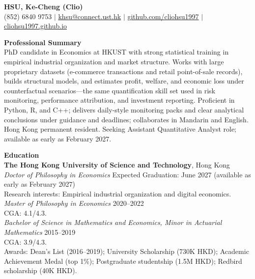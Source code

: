 \documentclass[11pt,letterpaper]{article}
\begin{document}
{\Large \textbf{HSU, Ke-Cheng (Clio)}}\\[1pt]
(852) 6840 9753 \quad $|$ \quad \href{mailto:khsu@connect.ust.hk}{khsu@connect.ust.hk} \quad $|$ \quad \href{https://github.com/cliohsu1997}{github.com/cliohsu1997} \quad $|$ \quad \href{https://cliohsu1997.github.io/}{cliohsu1997.github.io}

\vspace{0.15pt}

{\large \textbf{Professional Summary}}\\[-0.5pt]
PhD candidate in Economics at HKUST with strong statistical training in empirical industrial organization and market structure. Works with large proprietary datasets (e-commerce transactions and retail point-of-sale records), builds structural models, and estimates profit, welfare, and economic loss under counterfactual scenarios---the same quantification skill set used in risk monitoring, performance attribution, and investment reporting. Proficient in Python, R, and C++; delivers daily-style monitoring packs and clear analytical conclusions under guidance and deadlines; collaborates in Mandarin and English. Hong Kong permanent resident. Seeking Assistant Quantitative Analyst role; available as early as February 2027.

\vspace{0.15pt}

{\large \textbf{Education}}\\[-0.5pt]
\textbf{The Hong Kong University of Science and Technology}, Hong Kong\\
\textit{Doctor of Philosophy in Economics} \hfill Expected Graduation: June 2027 (available as early as February 2027)\\
Research interests: Empirical industrial organization and digital economics.\\
\textit{Master of Philosophy in Economics} \hfill 2020--2022\\
CGA: 4.1/4.3.\\
\textit{Bachelor of Science in Mathematics and Economics, Minor in Actuarial Mathematics} \hfill 2015--2019\\
CGA: 3.9/4.3.\\
Awards: Dean's List (2016--2019); University Scholarship (730K HKD); Academic Achievement Medal (top 1\%); Postgraduate studentship (1.5M HKD); Redbird scholarship (40K HKD).

\vspace{0.15pt}
\end{document}
